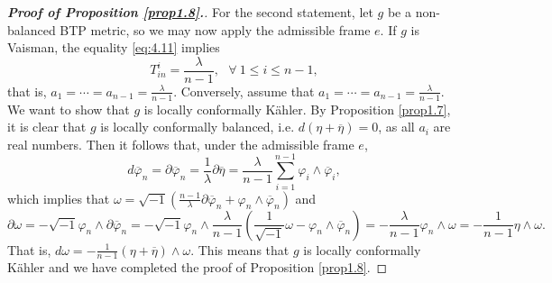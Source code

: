 \documentclass{amsart}
\numberwithin{equation}{section}
\theoremstyle{definition}
\renewcommand{\1}{\mathds{1}}
\renewcommand{\>}{\rightarrow}
\begin{document}
\begin{proof}[{\bf Proof of Proposition \ref{prop1.8}.}]
For the second statement, let $g$ be a non-balanced BTP metric, so we may now apply the admissible frame $e$. If $g$ is Vaisman, the equality \eqref{eq:4.11} implies
$$ T^i_{in}=\frac{\lambda}{n-1}, \ \ \  \forall \ 1\leq i\leq n-1,$$
that is, $a_1=\cdots =a_{n-1}=\frac{\lambda}{n-1}$. Conversely, assume that $a_1=\cdots =a_{n-1}=\frac{\lambda}{n-1}$. We want to show that $g$ is locally conformally K\"ahler.
By Proposition \ref{prop1.7}, it is clear that $g$ is locally conformally balanced, i.e. $d(\eta+\overline{\eta})=0$, as all $a_i$ are real numbers.
Then it follows that, under the admissible frame $e$,
$$ d\overline{\varphi}_n = \partial \overline{\varphi}_n = \frac{1}{\lambda}  \partial \overline{\eta }
= \frac{\lambda}{n-1} \sum_{i=1}^{n-1} \varphi_i \wedge \overline{\varphi}_i, $$
which implies that $\omega = \sqrt{-1}( \frac{n-1}{\lambda} \partial \overline{\varphi}_n + \varphi_n \wedge \overline{\varphi}_n)$ and
$$ \partial \omega = - \sqrt{-1} \varphi_n \wedge \partial \overline{\varphi}_n
= - \sqrt{-1} \varphi_n \wedge \frac{\lambda}{n-1} ( \frac{1}{\sqrt{-1}} \omega - \varphi_n \wedge \overline{\varphi}_n)
= - \frac{\lambda}{n-1} \varphi_n \wedge \omega = -\frac{1}{n-1}\eta \wedge \omega.$$
That is, $d \omega = -\frac{1}{n-1}(\eta+\overline{\eta}) \wedge \omega$. This means that $g$ is locally conformally K\"ahler and we have
 completed the proof of Proposition \ref{prop1.8}.
\end{proof}
\end{document}
